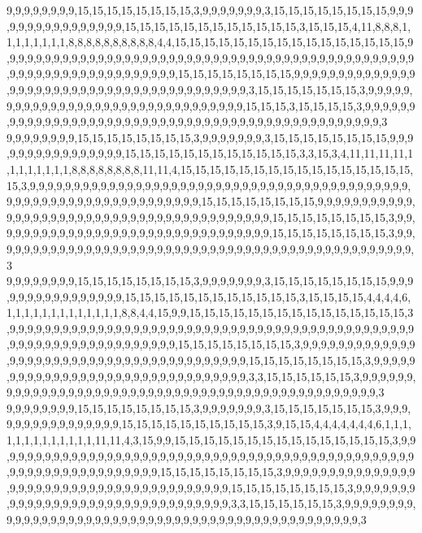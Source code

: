 9,9,9,9,9,9,9,9,15,15,15,15,15,15,15,15,3,9,9,9,9,9,9,9,3,15,15,15,15,15,15,15,15,9,9,9,9,9,9,9,9,9,9,9,9,9,9,9,9,15,15,15,15,15,15,15,15,15,15,15,15,3,15,15,15,4,11,8,8,8,1,1,1,1,1,1,1,1,8,8,8,8,8,8,8,8,8,8,4,4,15,15,15,15,15,15,15,15,15,15,15,15,15,15,15,15,9,9,9,9,9,9,9,9,9,9,9,9,9,9,9,9,9,9,9,9,9,9,9,9,9,9,9,9,9,9,9,9,9,9,9,9,9,9,9,9,9,9,9,9,9,9,9,9,9,9,9,9,9,9,9,9,9,9,9,9,9,9,9,9,9,9,15,15,15,15,15,15,15,15,9,9,9,9,9,9,9,9,9,9,9,9,9,9,9,9,9,9,9,9,9,9,9,9,9,9,9,9,9,9,9,9,9,9,9,9,9,9,9,9,9,3,15,15,15,15,15,15,15,3,9,9,9,9,9,9,9,9,9,9,9,9,9,9,9,9,9,9,9,9,9,9,9,9,9,9,9,9,9,9,9,9,15,15,15,3,15,15,15,15,3,9,9,9,9,9,9,9,9,9,9,9,9,9,9,9,9,9,9,9,9,9,9,9,9,9,9,9,9,9,9,9,9,9,9,9,9,9,9,9,9,9,9,9,9,9,9,9,9,3
9,9,9,9,9,9,9,9,15,15,15,15,15,15,15,15,3,9,9,9,9,9,9,9,3,15,15,15,15,15,15,15,15,9,9,9,9,9,9,9,9,9,9,9,9,9,9,9,9,15,15,15,15,15,15,15,15,15,15,15,15,3,3,15,3,4,11,11,11,11,1,1,1,1,1,1,1,1,8,8,8,8,8,8,8,8,11,11,4,15,15,15,15,15,15,15,15,15,15,15,15,15,15,15,15,15,3,9,9,9,9,9,9,9,9,9,9,9,9,9,9,9,9,9,9,9,9,9,9,9,9,9,9,9,9,9,9,9,9,9,9,9,9,9,9,9,9,9,9,9,9,9,9,9,9,9,9,9,9,9,9,9,9,9,9,9,9,9,9,9,9,9,15,15,15,15,15,15,15,15,9,9,9,9,9,9,9,9,9,9,9,9,9,9,9,9,9,9,9,9,9,9,9,9,9,9,9,9,9,9,9,9,9,9,9,9,9,9,9,9,9,15,15,15,15,15,15,15,15,3,9,9,9,9,9,9,9,9,9,9,9,9,9,9,9,9,9,9,9,9,9,9,9,9,9,9,9,9,9,9,9,9,15,15,15,15,15,15,15,15,3,9,9,9,9,9,9,9,9,9,9,9,9,9,9,9,9,9,9,9,9,9,9,9,9,9,9,9,9,9,9,9,9,9,9,9,9,9,9,9,9,9,9,9,9,9,9,9,9,3
9,9,9,9,9,9,9,9,15,15,15,15,15,15,15,15,3,9,9,9,9,9,9,9,3,15,15,15,15,15,15,15,15,9,9,9,9,9,9,9,9,9,9,9,9,9,9,9,9,15,15,15,15,15,15,15,15,15,15,15,15,3,15,15,15,15,4,4,4,4,6,1,1,1,1,1,1,1,1,1,1,1,1,1,8,8,4,4,15,9,9,15,15,15,15,15,15,15,15,15,15,15,15,15,15,15,3,9,9,9,9,9,9,9,9,9,9,9,9,9,9,9,9,9,9,9,9,9,9,9,9,9,9,9,9,9,9,9,9,9,9,9,9,9,9,9,9,9,9,9,9,9,9,9,9,9,9,9,9,9,9,9,9,9,9,9,9,9,9,9,9,9,15,15,15,15,15,15,15,15,3,9,9,9,9,9,9,9,9,9,9,9,9,9,9,9,9,9,9,9,9,9,9,9,9,9,9,9,9,9,9,9,9,9,9,9,9,9,9,9,9,15,15,15,15,15,15,15,15,3,9,9,9,9,9,9,9,9,9,9,9,9,9,9,9,9,9,9,9,9,9,9,9,9,9,9,9,9,9,9,9,9,3,3,15,15,15,15,15,15,3,9,9,9,9,9,9,9,9,9,9,9,9,9,9,9,9,9,9,9,9,9,9,9,9,9,9,9,9,9,9,9,9,9,9,9,9,9,9,9,9,9,9,9,9,9,9,9,9,3
9,9,9,9,9,9,9,9,15,15,15,15,15,15,15,15,3,9,9,9,9,9,9,9,3,15,15,15,15,15,15,15,3,9,9,9,9,9,9,9,9,9,9,9,9,9,9,9,9,15,15,15,15,15,15,15,15,15,15,3,9,15,15,4,4,4,4,4,4,4,6,1,1,1,1,1,1,1,1,1,1,1,1,1,11,11,4,3,15,9,9,15,15,15,15,15,15,15,15,15,15,15,15,15,15,15,3,9,9,9,9,9,9,9,9,9,9,9,9,9,9,9,9,9,9,9,9,9,9,9,9,9,9,9,9,9,9,9,9,9,9,9,9,9,9,9,9,9,9,9,9,9,9,9,9,9,9,9,9,9,9,9,9,9,9,9,9,9,9,9,9,9,15,15,15,15,15,15,15,15,3,9,9,9,9,9,9,9,9,9,9,9,9,9,9,9,9,9,9,9,9,9,9,9,9,9,9,9,9,9,9,9,9,9,9,9,9,9,9,9,9,15,15,15,15,15,15,15,15,3,9,9,9,9,9,9,9,9,9,9,9,9,9,9,9,9,9,9,9,9,9,9,9,9,9,9,9,9,9,9,9,9,3,3,15,15,15,15,15,15,3,9,9,9,9,9,9,9,9,9,9,9,9,9,9,9,9,9,9,9,9,9,9,9,9,9,9,9,9,9,9,9,9,9,9,9,9,9,9,9,9,9,9,9,9,9,9,9,9,3

